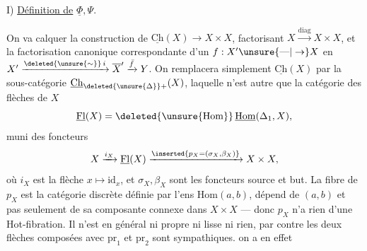
I) \uline{Définition de} $\underline{\Phi},\Psi$.

On va calquer la construction  de $\underline{\mathrm{Ch}}(X)\to X\times X$,  factorisant $X\xrightarrow{\mathrm{diag}}X\times X$, et la  factorisation canonique correspondante d'un $f:X'\unsure{\text{---}|\to}X$ en $X'\xrightarrow{\deleted{\unsure{\sim}}\,i}\overline{X}'\xrightarrow{\bar f}Y$. On remplacera simplement $\underline{\mathrm{Ch}}(X)$ par la sous-catégorie $\underline{\mathrm{Ch}}_{\deleted{\unsure{\Delta}}+}(X)$, laquelle n'est autre que la catégorie des flèches de $X$
\[ \underline{\mathrm{Fl}}(X)=\deleted{\unsure{\mathrm{Hom}}}\,\underline{\mathrm{Hom}}(\Delta_1,X), \]
muni des foncteurs
\[ X\xrightarrow{i_X}\underline{\mathrm{Fl}}(X)\xrightarrow{\inserted{p_X=(\sigma_X,\beta_X)}} X\times X, \]
où $i_X$ est la flèche $x\longmapsto\mathrm{id}_x$, et  $\sigma_X,\beta_X$ sont les foncteurs source et but. La fibre de $p_X$  est la catégorie discrète définie par l'ens $\mathrm{Hom}(a,b)$,  dépend  de $(a,b)$ et pas seulement de sa composante connexe dans $X\times X$ --- donc $p_X$ n'a rien d'une Hot-fibration. Il n'est en général ni propre ni lisse\unsure{,} ni rien, par contre les deux flèches composées avec $\mathrm{pr}_1$ et $\mathrm{pr}_2$
sont sympathiques. on a en effet

